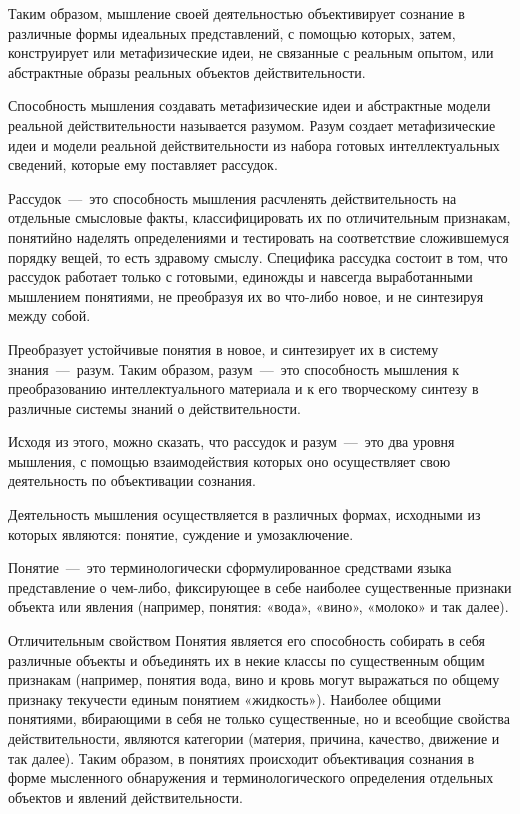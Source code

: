 \documentclass[14pt]{extarticle}
\begin{document}
Таким образом, мышление своей деятельностью объективирует сознание в различные формы идеальных представлений, с помощью которых, затем, конструирует или метафизические идеи, не связанные с реальным опытом, или абстрактные образы реальных объектов действительности.

Способность мышления создавать метафизические идеи и абстрактные модели реальной действительности называется разумом. Разум создает метафизические идеи и модели реальной действительности из набора готовых интеллектуальных сведений, которые ему поставляет рассудок.

Рассудок~---~это способность мышления расчленять действительность на отдельные смысловые факты, классифицировать их по отличительным признакам, понятийно наделять определениями и тестировать на соответствие сложившемуся порядку вещей, то есть здравому смыслу. Специфика рассудка состоит в том, что рассудок работает только с готовыми, единожды и навсегда выработанными мышлением понятиями, не преобразуя их во что-либо новое, и не синтезируя между собой.

Преобразует устойчивые понятия в новое, и синтезирует их в систему знания~---~разум. Таким образом, разум~---~это способность мышления к преобразованию интеллектуального материала и к его творческому синтезу в различные системы знаний о действительности.

Исходя из этого, можно сказать, что рассудок и разум~---~это два уровня мышления, с помощью взаимодействия которых оно осуществляет свою деятельность по объективации сознания.

Деятельность мышления осуществляется в различных формах, исходными из которых являются: понятие, суждение и умозаключение.

Понятие~---~это терминологически сформулированное средствами языка представление о чем-либо, фиксирующее в себе наиболее существенные признаки объекта или явления (например, понятия: «вода», «вино», «молоко» и так далее).

Отличительным свойством Понятия является его способность собирать в себя различные объекты и объединять их в некие классы по существенным общим признакам (например, понятия вода, вино и кровь могут выражаться по общему признаку текучести единым понятием «жидкость»). Наиболее общими понятиями, вбирающими в себя не только существенные, но и всеобщие свойства действительности, являются категории (материя, причина, качество, движение и так далее). Таким образом, в понятиях происходит объективация сознания в форме мысленного обнаружения и терминологического определения отдельных объектов и явлений действительности.
\end{document}
